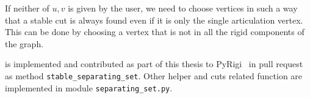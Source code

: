 If neither of \( u, v \) is given by the user,
we need to choose vertices in such a way
that a stable cut is always found even if it is only the single articulation vertex.
This can be done by choosing a vertex that is not in all the rigid components of the graph.

%
is implemented and contributed as part of this thesis
to PyRigi~\cite{pyrigi} in pull request~\cite{pyrigi_pr_stable_cuts}
as method \texttt{stable\_separating\_set}.
Other helper and cuts related function
are implemented in module \texttt{separating\_set.py}.

